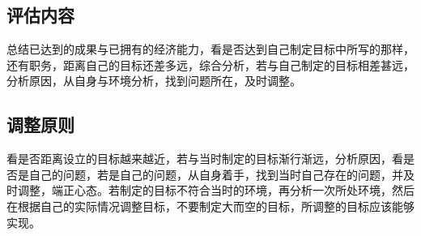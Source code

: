 \documentclass{article}
\begin{document}
\subsection{评估内容}
\par
总结已达到的成果与已拥有的经济能力，看是否达到自己制定目标中所写的那样，还有职务，距离自己的目标还差多远，综合分析，若与自己制定的目标相差甚远，分析原因，从自身与环境分析，找到问题所在，及时调整。\par
\subsection{调整原则}
\par
看是否距离设立的目标越来越近，若与当时制定的目标渐行渐远，分析原因，看是否是自己的问题，若是自己的问题，从自身着手，找到当时自己存在的问题，并及时调整，端正心态。若制定的目标不符合当时的环境，再分析一次所处环境，然后在根据自己的实际情况调整目标，不要制定大而空的目标，所调整的目标应该能够实现。\par
\end{document}
